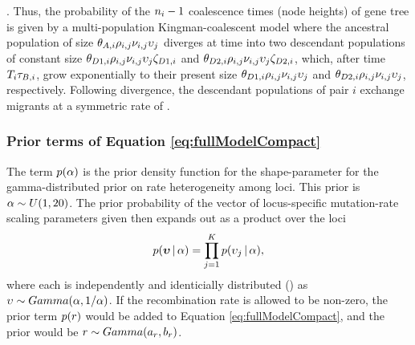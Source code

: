 \documentclass[letterpaper,12pt]{article}
\begin{document}
\begin{linenumbers}
\begin{linenomath}
\migrationRate{}.
Thus, the probability of the $\popSampleSize{i}{}-1$ coalescence times (node
heights) of gene tree  is given by a multi-population
Kingman-coalescent model \citep{Kingman1982} where the ancestral population of
size
$\ancestralTheta{i}\ploidyScalar{i}{j}\mutationRateScalarConstant{i}{j}\locusMutationRateScalar{j}$
diverges at time  into two descendant populations of constant
size
$\descendantTheta{1}{i}\ploidyScalar{i}{j}\mutationRateScalarConstant{i}{j}\locusMutationRateScalar{j}\bottleScalar{1}{i}$
and
$\descendantTheta{2}{i}\ploidyScalar{i}{j}\mutationRateScalarConstant{i}{j}\locusMutationRateScalar{j}\bottleScalar{2}{i}$,
which, after time $\divTimeMap{i}\bottleTime{i}$, grow exponentially to their
present size 
$\descendantTheta{1}{i}\ploidyScalar{i}{j}\mutationRateScalarConstant{i}{j}\locusMutationRateScalar{j}$
and
$\descendantTheta{2}{i}\ploidyScalar{i}{j}\mutationRateScalarConstant{i}{j}\locusMutationRateScalar{j}$,
respectively.
Following divergence, the descendant populations of pair $i$ exchange migrants at a symmetric rate of
.
\end{linenomath}

\subsubsection*{Prior terms of Equation \ref{eq:fullModelCompact}}
\begin{linenomath}
The term $p(\alpha)$ is the prior density
function for the shape-parameter for the gamma-distributed prior on
rate heterogeneity among loci.
This prior is $\alpha \sim U(1, 20)$.
The prior probability of the vector of locus-specific mutation-rate scaling parameters
given \locusRateHetShapeParameter then expands out as a product over
the loci
\begin{equation}
    p(\boldsymbol{\upsilon} \,|\, \alpha) =
    \prod_{j=1}^{K}
    p(\upsilon_{j} \,|\, \alpha),
    \label{eq:locusRateHetPrior}
\end{equation}
where each \locusMutationRateScalar{} is independently and identicially
distributed (\iid) as
$\upsilon_{} \sim Gamma(\alpha,
1/\alpha)$.
If the recombination rate \recombinationRate is allowed to be
non-zero, the prior term $p(r)$ would be added
to Equation \ref{eq:fullModelCompact}, and the prior would be
$r \sim Gamma(a_{r},
b_{r})$.
\end{linenomath}


\end{linenumbers}
\end{document}
